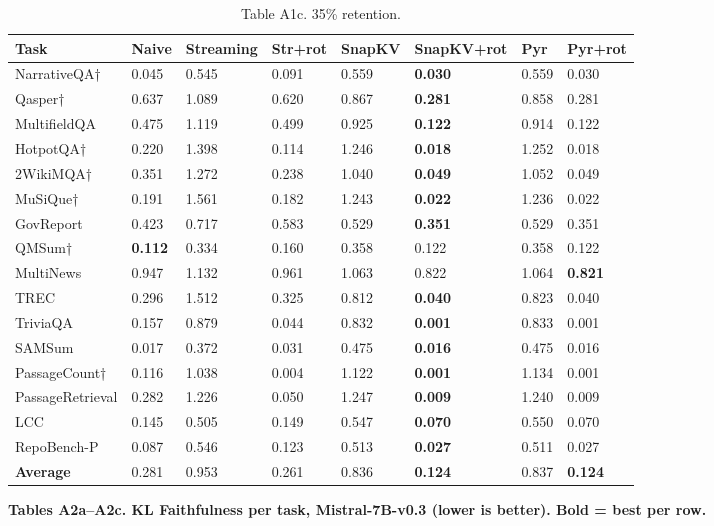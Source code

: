 \documentclass[10pt,letterpaper]{article}
\begin{document}
\begin{table}[H]
\centering
\small
\caption*{Table A1c. 35\% retention.}
\begin{tabular}{@{}llllllll@{}}
\toprule
Task & Naive & Streaming & Str+rot & SnapKV & SnapKV+rot & Pyr &
Pyr+rot\\
\midrule
NarrativeQA† & 0.045 & 0.545 & 0.091 & 0.559 & \textbf{0.030} & 0.559 & 0.030\\
Qasper† & 0.637 & 1.089 & 0.620 & 0.867 & \textbf{0.281} & 0.858 & 0.281\\
MultifieldQA & 0.475 & 1.119 & 0.499 & 0.925 & \textbf{0.122} & 0.914 & 0.122\\
HotpotQA† & 0.220 & 1.398 & 0.114 & 1.246 & \textbf{0.018} & 1.252 & 0.018\\
2WikiMQA† & 0.351 & 1.272 & 0.238 & 1.040 & \textbf{0.049} & 1.052 & 0.049\\
MuSiQue† & 0.191 & 1.561 & 0.182 & 1.243 & \textbf{0.022} & 1.236 & 0.022\\
GovReport & 0.423 & 0.717 & 0.583 & 0.529 & \textbf{0.351} & 0.529 & 0.351\\
QMSum† & \textbf{0.112} & 0.334 & 0.160 & 0.358 & 0.122 & 0.358 & 0.122\\
MultiNews & 0.947 & 1.132 & 0.961 & 1.063 & 0.822 & 1.064 & \textbf{0.821}\\
TREC & 0.296 & 1.512 & 0.325 & 0.812 & \textbf{0.040} & 0.823 & 0.040\\
TriviaQA & 0.157 & 0.879 & 0.044 & 0.832 & \textbf{0.001} & 0.833 & 0.001\\
SAMSum & 0.017 & 0.372 & 0.031 & 0.475 & \textbf{0.016} & 0.475 & 0.016\\
PassageCount† & 0.116 & 1.038 & 0.004 & 1.122 & \textbf{0.001} & 1.134 & 0.001\\
PassageRetrieval & 0.282 & 1.226 & 0.050 & 1.247 & \textbf{0.009} & 1.240 & 0.009\\
LCC & 0.145 & 0.505 & 0.149 & 0.547 & \textbf{0.070} & 0.550 & 0.070\\
RepoBench-P & 0.087 & 0.546 & 0.123 & 0.513 & \textbf{0.027} & 0.511 & 0.027\\
\textbf{Average} & 0.281 & 0.953 & 0.261 & 0.836 & \textbf{0.124} & 0.837 & \textbf{0.124}\\
\bottomrule
\end{tabular}
\end{table}

\textbf{Tables A2a--A2c. KL Faithfulness per task, Mistral-7B-v0.3
(lower is better). Bold = best per row.}
\end{document}
